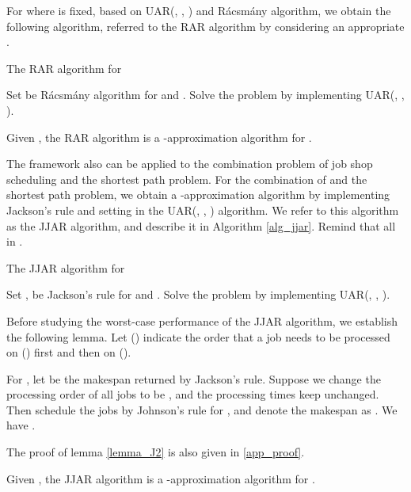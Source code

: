 \documentclass{llncs}
\numberwithin{subcase}{case}
\begin{document}
For  where  is fixed, based on UAR(, , ) and R{\'a}csm{\'a}ny algorithm, we obtain the following algorithm, referred to the RAR algorithm by considering an appropriate .

\begin{algorithm}[htb]
\caption{The RAR algorithm for }
\label{alg_rar}
\begin{algorithmic}[1]
\STATE Set  be R{\'a}csm{\'a}ny algorithm for  and .
\STATE Solve the problem by implementing UAR(, , ).
\end{algorithmic}
\end{algorithm}
\begin{theorem}
Given , the RAR algorithm is a -approximation algorithm for .  \label{th_RAR}
\end{theorem}

The framework also can be applied to the combination problem of job shop scheduling and the shortest path problem. For the combination of  and the shortest path problem, we obtain a -approximation algorithm by implementing Jackson's rule and setting  in the UAR(, , ) algorithm. We refer to this algorithm as the JJAR algorithm, and describe it in Algorithm \ref{alg_jjar}. Remind that all  in .

\begin{algorithm}[htb]
\caption{The JJAR algorithm for }
\label{alg_jjar}
\begin{algorithmic}[1]
\STATE Set ,  be Jackson's rule for  and .
\STATE Solve the problem by implementing UAR(, , ).
\end{algorithmic}
\end{algorithm}

Before studying the worst-case performance of the JJAR algorithm, we establish the following lemma. Let  () indicate the order that a job needs to be processed on  () first and then on  ().

\begin{lemma}
For , let  be the makespan returned by Jackson's rule. Suppose we change the processing order of all jobs to be  , and the processing times keep unchanged. Then schedule the jobs by Johnson's rule for , and denote the makespan as  . We have . \label{lemma_J2}
\end{lemma}

The proof of lemma \ref{lemma_J2} is also given in \ref{app_proof}.
\begin{theorem}
Given , the JJAR algorithm is a -approximation algorithm for .  \label{th_jjar}
\end{theorem}
\end{document}
